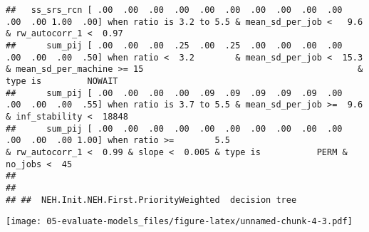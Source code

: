\documentclass[
]{article}
\begin{document}
\begin{verbatim}
##   ss_srs_rcn [ .00  .00  .00  .00  .00  .00  .00  .00  .00  .00  .00  .00 1.00  .00] when ratio is 3.2 to 5.5 & mean_sd_per_job <   9.6                             & rw_autocorr_1 <  0.97                                                                                                       
##      sum_pij [ .00  .00  .00  .25  .00  .25  .00  .00  .00  .00  .00  .00  .00  .50] when ratio <  3.2        & mean_sd_per_job <  15.3 & mean_sd_per_machine >= 15                                          & type is         NOWAIT                                                             
##      sum_pij [ .00  .00  .00  .00  .09  .09  .09  .09  .09  .00  .00  .00  .00  .55] when ratio is 3.7 to 5.5 & mean_sd_per_job >=  9.6                                                                                                                                   & inf_stability <  18848
##      sum_pij [ .00  .00  .00  .00  .00  .00  .00  .00  .00  .00  .00  .00  .00 1.00] when ratio >=        5.5                                                       & rw_autocorr_1 <  0.99 & slope <  0.005 & type is           PERM & no_jobs <  45                                             
## 
## 
## ##  NEH.Init.NEH.First.PriorityWeighted  decision tree
\end{verbatim}

\texttt{[image: 05-evaluate-models\_files/figure-latex/unnamed-chunk-4-3.pdf]}
\end{document}
